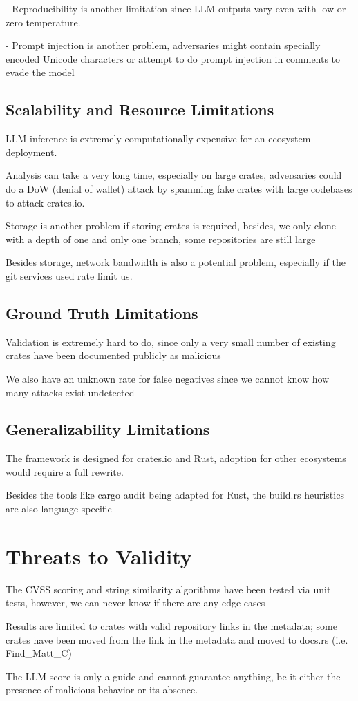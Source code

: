 - Reproducibility is another limitation since LLM outputs vary even with low or zero temperature.

- Prompt injection is another problem, adversaries might contain specially encoded Unicode characters or attempt to do prompt injection in comments to evade the model

\subsection{Scalability and Resource Limitations}\label{subsect:scalability-limitations}

LLM inference is extremely computationally expensive for an ecosystem deployment.

Analysis can take a very long time, especially on large crates, adversaries could do a DoW (denial of wallet) attack by spamming fake crates with large codebases to attack crates.io.

Storage is another problem if storing crates is required, besides, we only clone with a depth of one and only one branch, some repositories are still large

Besides storage, network bandwidth is also a potential problem, especially if the git services used rate limit us.

\subsection{Ground Truth Limitations}\label{subsect:ground-truth-limitations}

Validation is extremely hard to do, since only a very small number of existing crates have been documented publicly as malicious

We also have an unknown rate for false negatives since we cannot know how many attacks exist undetected

\subsection{Generalizability Limitations}\label{subsect:generalizability-limitations}

The framework is designed for crates.io and Rust, adoption for other ecosystems would require a full rewrite.

Besides the tools like cargo audit being adapted for Rust, the build.rs heuristics are also language-specific

\section{Threats to Validity}\label{sect:threats}

The CVSS scoring and string similarity algorithms have been tested via unit tests, however, we can never know if there are any edge cases

Results are limited to crates with valid repository links in the metadata; some crates have been moved from the link in the metadata and moved to docs.rs (i.e. Find\_Matt\_C)

The LLM score is only a guide and cannot guarantee anything, be it either the presence of malicious behavior or its absence.